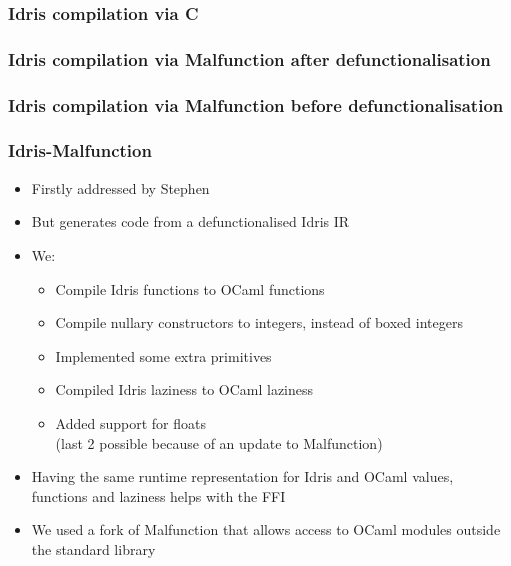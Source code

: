 \documentclass[aspectratio=169]{beamer}
\begin{document}
\begin{frame}
  \frametitle{Idris compilation via C}
  \centering
\end{frame}

\begin{frame}
  \frametitle{Idris compilation via Malfunction after defunctionalisation}
  \centering
\end{frame}

\begin{frame}
  \frametitle{Idris compilation via Malfunction before defunctionalisation}
  \centering
\end{frame}

\begin{frame}[t]
  \frametitle{Idris-Malfunction}
  \begin{itemize}
    \item Firstly addressed by Stephen
    \item But generates code from a defunctionalised Idris IR
    \item We:
          \begin{itemize}
            \item<2-> Compile Idris functions to OCaml functions
            \item<3-> Compile nullary constructors to integers, instead of
                  boxed integers
            \item<4-> Implemented some extra primitives
            \item<5-> Compiled Idris laziness to OCaml laziness
            \item<6-> Added support for floats
                  \\ (last 2 possible because of an update to Malfunction)
          \end{itemize}
    \item<7-> Having the same runtime representation for Idris and OCaml
          values, functions and laziness helps with the FFI
    \item<8-> We used a fork of Malfunction that allows access to OCaml
          modules outside the standard library
  \end{itemize}
\end{frame}
\end{document}
